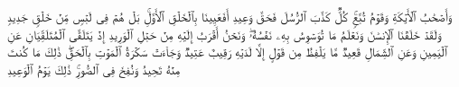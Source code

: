 \stopbuffer
\startbuffer[\q:50:14]
وَأَصۡحَٰبُ ٱلۡأَیۡكَةِ وَقَوۡمُ تُبَّعࣲۚ كُلࣱّ كَذَّبَ ٱلرُّسُلَ فَحَقَّ وَعِیدِ%
\stopbuffer
\startbuffer[\q:50:15]
أَفَعَیِینَا بِٱلۡخَلۡقِ ٱلۡأَوَّلِۚ بَلۡ هُمۡ فِی لَبۡسࣲ مِّنۡ خَلۡقࣲ جَدِیدࣲ%
\stopbuffer
\startbuffer[\q:50:16]
وَلَقَدۡ خَلَقۡنَا ٱلۡإِنسَٰنَ وَنَعۡلَمُ مَا تُوَسۡوِسُ بِهِۦ نَفۡسُهُۥۖ وَنَحۡنُ أَقۡرَبُ إِلَیۡهِ مِنۡ حَبۡلِ ٱلۡوَرِیدِ%
\stopbuffer
\startbuffer[\q:50:17]
إِذۡ یَتَلَقَّى ٱلۡمُتَلَقِّیَانِ عَنِ ٱلۡیَمِینِ وَعَنِ ٱلشِّمَالِ قَعِیدࣱ%
\stopbuffer
\startbuffer[\q:50:18]
مَّا یَلۡفِظُ مِن قَوۡلٍ إِلَّا لَدَیۡهِ رَقِیبٌ عَتِیدࣱ%
\stopbuffer
\startbuffer[\q:50:19]
وَجَاۤءَتۡ سَكۡرَةُ ٱلۡمَوۡتِ بِٱلۡحَقِّۖ ذَٰلِكَ مَا كُنتَ مِنۡهُ تَحِیدُ%
\stopbuffer
\startbuffer[\q:50:20]
وَنُفِخَ فِی ٱلصُّورِۚ ذَٰلِكَ یَوۡمُ ٱلۡوَعِیدِ%
\stopbuffer
